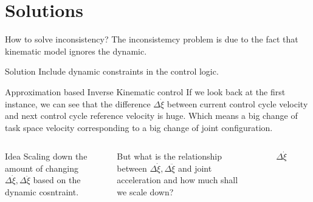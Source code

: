 \documentclass[10pt]{beamer}
\begin{document}
\section{Solutions}
\begin{frame}{How to solve inconsistency?}
The inconsistemcy problem is due to the fact that kinematic model ignores the dynamic. 

\begin{block}{Solution}
  Include dynamic constraints in the control logic.
\end{block}
 
\end{frame}

\begin{frame}{Approximation based Inverse Kinematic control}
  If we look back at the first instance, we can see that the difference $\Delta\dot{\xi}$ between current control cycle velocity and 
  next control cycle reference velocity is huge. Which means a big change of task space velocity corresponding to a big change 
  of joint configuration. 

  \begin{columns}[T,onlytextwidth]
    \begin{block}{Idea}
      Scaling down the amount of changing $\Delta\dot{\xi},\Delta\ddot{\xi}$ based on the dynamic cosntraint.
    \end{block}

      But what is the relationship between $\Delta\dot{\xi},\Delta\ddot{\xi}$ and joint acceleration and how much shall we scale down?


    \begin{figure}
      \begin{center}
      \resizebox{5cm}{!}
        {
        }
      \end{center}
      \caption{$\Delta\dot{\xi}$}
    \end{figure}


\end{columns}
\end{frame}
\end{document}
